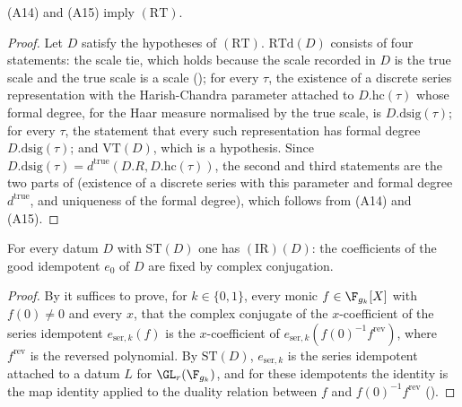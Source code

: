 \begin{lemma}\label{pf:baselat1:realOf}
(A14) and (A15) imply $(\mathrm{RT})$.
\end{lemma}

\begin{proof}
Let $D$ satisfy the hypotheses of $(\mathrm{RT})$. $\mathrm{RTd}(D)$ consists of four statements: the
scale tie, which holds because the scale recorded in $D$ is the true scale and the true scale is a scale
(); for every $\tau$, the existence of a
discrete series representation with the Harish-Chandra parameter attached to $D.\mathrm{hc}(\tau)$ whose formal
degree, for the Haar measure normalised by the true scale, is $D.\mathrm{dsig}(\tau)$; for every $\tau$, the
statement that every such representation has formal degree $D.\mathrm{dsig}(\tau)$; and $\mathrm{VT}(D)$,
which is a hypothesis. Since $D.\mathrm{dsig}(\tau)=d^{\mathrm{true}}(D.R,D.\mathrm{hc}(\tau))$, the second and
third statements are the two parts of 
(existence of a discrete series with this parameter and formal degree $d^{\mathrm{true}}$, and uniqueness of the
formal degree), which follows from (A14) and (A15).
\end{proof}

\begin{lemma}\label{pf:baselat1:idem}
For every datum $D$ with $\mathrm{ST}(D)$ one has $(\mathrm{IR})(D)$: the coefficients of
the good idempotent $e_0$ of $D$ are fixed by complex conjugation.
\end{lemma}

\begin{proof}
By  it suffices to prove, for $k\in\{0,1\}$, every
monic $f\in\F_{g_k}[X]$ with $f(0)\ne0$ and every $x$, that the complex conjugate of the $x$-coefficient of
the series idempotent $e_{\mathrm{ser},k}(f)$ is the $x$-coefficient of $e_{\mathrm{ser},k}(f(0)^{-1}f^{\mathrm{rev}})$,
where $f^{\mathrm{rev}}$ is the reversed polynomial. By $\mathrm{ST}(D)$, $e_{\mathrm{ser},k}$ is the series
idempotent attached to a datum $L$ for $\GL_r(\F_{g_k})$, and for these idempotents the identity is the map
identity  applied to the duality relation between $f$ and
$f(0)^{-1}f^{\mathrm{rev}}$ ().
\end{proof}

